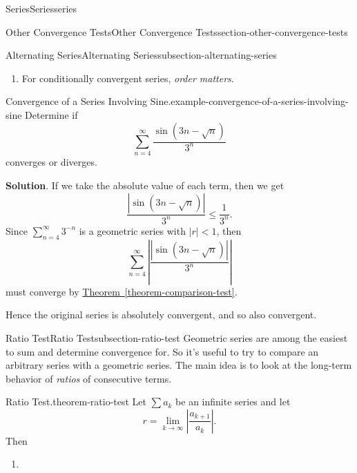 \documentclass[oneside,10pt,]{book}
\numberwithin{equation}{section}
\newcommand{\lt}{<}
\begin{document}
\begin{chapterptx}{Series}{}{Series}{}{}{series}
\begin{sectionptx}{Other Convergence Tests}{}{Other Convergence Tests}{}{}{section-other-convergence-tests}
\begin{subsectionptx}{Alternating Series}{}{Alternating Series}{}{}{subsection-alternating-series}
\begin{enumerate}
Absolutely convergent series are also convergent series.%
\item\hypertarget{li-100}{}\hypertarget{p-909}{}%
For conditionally convergent series, \emph{order matters}.%
\end{enumerate}
%
\begin{example}{Convergence of a Series Involving Sine.}{example-convergence-of-a-series-involving-sine}%
\hypertarget{p-910}{}%
Determine if%
\begin{equation*}
\sum_{n=4}^{\infty}\frac{\sin(3n - \sqrt{n})}{3^{n}}
\end{equation*}
converges or diverges.%
\par\smallskip%
\noindent\textbf{Solution}.\hypertarget{solution-187}{}\quad%
\hypertarget{p-911}{}%
If we take the absolute value of each term, then we get%
\begin{equation*}
\frac{|\sin(3n - \sqrt{n})|}{3^{n}} \leq \frac{1}{3^{n}}\text{.}
\end{equation*}
Since \(\sum_{n=4}^{\infty}3^{-n}\) is a geometric series with \(|r|\lt 1\), then%
\begin{equation*}
\sum_{n=4}^{\infty}\left|\frac{|\sin(3n - \sqrt{n})|}{3^{n}}\right|
\end{equation*}
must converge by \hyperref[theorem-comparison-test]{Theorem~\ref{theorem-comparison-test}}.%
\par
\hypertarget{p-912}{}%
Hence the original series is absolutely convergent, and so also convergent.%
\end{example}
\end{subsectionptx}
%
%
\typeout{************************************************}
\typeout{************************************************}
%
\begin{subsectionptx}{Ratio Test}{}{Ratio Test}{}{}{subsection-ratio-test}
\hypertarget{p-913}{}%
Geometric series are among the easiest to sum and determine convergence for. So it's useful to try to compare an arbitrary series with a geometric series. The main idea is to look at the long-term behavior of \emph{ratios} of consecutive terms.%
\begin{theorem}{Ratio Test.}{}{theorem-ratio-test}%
\hypertarget{p-914}{}%
Let \(\sum a_{k}\) be an infinite series and let%
\begin{equation*}
r = \lim_{k\to\infty}\left|\frac{a_{k+1}}{a_{k}}\right|\text{.}
\end{equation*}
Then\leavevmode%
\begin{enumerate}
\item\hypertarget{li-101}{}\hypertarget{p-915}{}%

\end{enumerate}
\end{theorem}
\end{subsectionptx}
\end{sectionptx}
\end{chapterptx}
\end{document}
